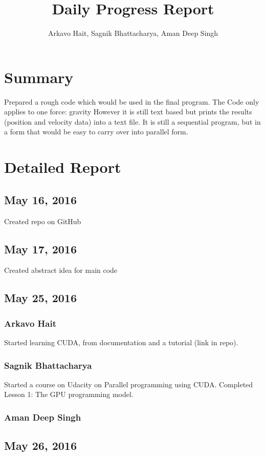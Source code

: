 \documentclass{article}
\title{Daily Progress Report}
\author{Arkavo Hait, Sagnik Bhattacharya, Aman Deep Singh}
\begin{document}
\maketitle
\section*{Summary}
Prepared a rough code which would be used in the final program.
The Code only applies to one force: gravity
However it is still text based but prints the results (position and velocity data) into a text file. It is still a sequential program, but in a form that would be easy to carry over into parallel form.
\section*{Detailed Report}
\subsection*{May 16, 2016}
Created repo on GitHub
\subsection*{May 17, 2016}
Created abstract idea for main code
\subsection*{May 25, 2016}
\subsubsection*{Arkavo Hait}
Started learning CUDA, from documentation and a tutorial (link in repo).
\subsubsection*{Sagnik Bhattacharya}
Started a course on Udacity on Parallel programming using CUDA. Completed Lesson 1: The GPU programming model.
\subsubsection*{Aman Deep Singh}
\subsection*{May 26, 2016}
\end{document}
